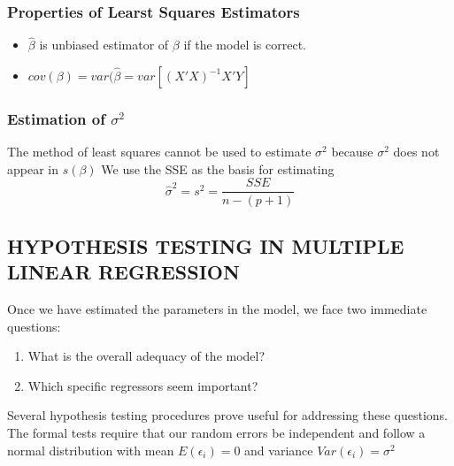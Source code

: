 \documentclass{article}
\numberwithin{equation}{section}
\begin{document}
\subsubsection*{Properties of Learst Squares Estimators}

\begin{itemize}
	\item $\hat{\beta}$ is unbiased estimator of $\beta$ if the model is correct.
	\item $cov(\beta)=var(\hat{\beta}=var[(X'X)^{-1}X'Y]$
\end{itemize}

\subsubsection*{Estimation of $\sigma^2$}
The method of least squares cannot be used to estimate $\sigma^2$ because $\sigma^2$ does not appear in $s(\beta)$
We use the SSE as the basis for estimating
$$
\hat{\sigma}^2=s^2=\frac{S S E}{n-(p+1)}
$$
\subsection{HYPOTHESIS TESTING IN MULTIPLE LINEAR REGRESSION}

Once we have estimated the parameters in the model, we face two
immediate questions:\\
\begin{enumerate}
	\item What is the overall adequacy of the model?
	\item Which specific regressors seem important? 
\end{enumerate}
Several hypothesis testing procedures prove useful for addressing
these questions. The formal tests require that our random errors be
independent and follow a normal distribution with mean $E(\epsilon_i)= 0$
and variance  $Var(\epsilon_i)=\sigma^2$ \\
\end{document}
